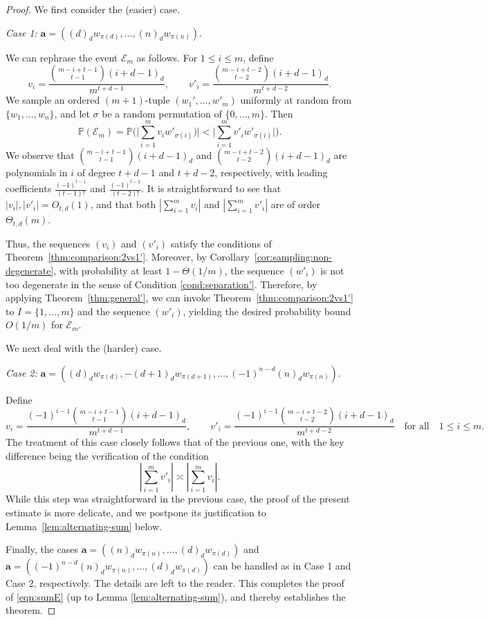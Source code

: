\documentclass[reqno]{amsart}
\renewcommand\P{{\mathbb{P}}}
\newcommand\CE{{\mathcal E}}
\theoremstyle{plain}
\theoremstyle{definition}
\begin{document}
\begin{proof}
We first consider the (easier) case. 

\textit{Case 1:} $\bm{a}=((d)_{d}w_{\pi(d)}, \dots, (n)_{d} w_{\pi(n)})$.

We can rephrase the event $\CE_{m}$ as follows. For $1\le i \le m$, define 
$$v_{i} = \frac{\binom{m-i+t-1}{t-1} (i+d-1)_{d}}{m^{t+d-1}}, \qquad v'_{i} = \frac{\binom{m-i+t-2}{t-2} (i+d-1)_{d}}{m^{t+d-2}}.$$ 
We sample an ordered $(m+1)$-tuple $(w_{1}',\dots, w'_{m})$ uniformly at random from $\{w_{1},\dots, w_{n}\}$, and let $\sigma$ be a random permutation of $\{0,\dots,m\}$. Then
$$\P(\CE_{m})=\P\Big(\Big|\sum_{i=1}^{m} v_{i}w'_{\sigma(i)})\Big|< \Big|\sum_{i=1}^{m} v'_{i}w'_{\sigma(i)}\Big|\Big).$$
We observe that $\binom{m-i+t-1}{t-1} (i+d-1)_{d}$ and $\binom{m-i+t-2}{t-2} (i+d-1)_{d}$ are polynomials in $i$ of degree $t+d-1$ and $t+d-2$, respectively, with leading coefficients $\frac{(-1)^{t-1}}{(t-1)!}$ and $\frac{(-1)^{t-2}}{(t-2)!}$. It is straightforward to see that $|v_{i}|, |v'_{i}|=O_{t,d}(1)$, and that both $|\sum_{i=1}^{m}v_{i}|$ and $|\sum_{i=1}^{m}v'_{i}|$ are of order $\Theta_{t,d}(m)$.

Thus, the sequences $(v_i)$ and $(v'_i)$ satisfy the conditions of Theorem~\ref{thm:comparison:2vs1'}. Moreover, by Corollary~\ref{cor:sampling:non-degenerate}, with probability at least $1 - \Theta(1/m)$, the sequence $(w'_{i})$ is not too degenerate in the sense of Condition \ref{cond:separation'}. Therefore, by applying Theorem~\ref{thm:general'}, we can invoke Theorem~\ref{thm:comparison:2vs1'} to $I = \{1, \dots, m\}$ and the sequence $(w'_i)$, yielding the desired probability bound $O(1/m)$ for $\CE_m$.

We next deal with the (harder) case.

\textit{Case 2:} $\bm{a} = \left( (d)_d w_{\pi(d)}, -(d+1)_d w_{\pi(d+1)}, \ldots, (-1)^{n-d}(n)_d w_{\pi(n)} \right)$.

Define
\[
v_i = \frac{(-1)^{i-1} \binom{m-i+t-1}{t-1} (i+d-1)_d}{m^{t+d-1}}, \qquad v'_i = \frac{(-1)^{i-1} \binom{m-i+t-2}{t-2} (i+d-1)_d}{m^{t+d-2}} \quad \text{for all} \quad 1\le i\le m.
\]
The treatment of this case closely follows that of the previous one, with the key difference being the verification of the condition 
$$|\sum_{i=1}^{m} v'_i| \asymp |\sum_{i=1}^{m} v_i|.$$ 
While this step was straightforward in the previous case, the proof of the present estimate is more delicate, and we postpone its justification to Lemma~\ref{lem:alternating-sum} below.

Finally, the cases $\bm{a} = \left( (n)_d w_{\pi(n)}, \ldots, (d)_d w_{\pi(d)} \right)$ and $\bm{a} = \left( (-1)^{n-d}(n)_d w_{\pi(n)}, \ldots, (d)_d w_{\pi(d)} \right)$ can be handled as in Case 1 and Case 2, respectively. The details are left to the reader. This completes the proof of \eqref{eqn:sumE} (up to Lemma \ref{lem:alternating-sum}), and thereby establishes the theorem.
\end{proof}
\end{document}
